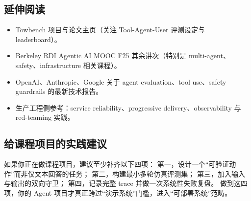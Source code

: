 \documentclass[a4paper]{article}
\begin{document}
\subsection{延伸阅读}

\begin{itemize}[leftmargin=1.5em]
    \item Towbench 项目与论文主页（关注 Tool-Agent-User 评测设定与 leaderboard）。
    \item Berkeley RDI Agentic AI MOOC F25 其余讲次（特别是 multi-agent、safety、infrastructure 相关课程）。
    \item OpenAI、Anthropic、Google 关于 agent evaluation、tool use、safety guardrails 的最新技术报告。
    \item 生产工程侧参考：service reliability、progressive delivery、observability 与 red-teaming 实践。
\end{itemize}

\subsection{给课程项目的实践建议}

如果你正在做课程项目，建议至少补齐以下四项：
第一，设计一个“可验证动作”而非仅文本回答的任务；
第二，构建最小多轮仿真评测集；
第三，加入输入与输出的双向守卫；
第四，记录完整 trace 并做一次系统性失败复盘。
做到这四项，你的 Agent 项目才真正跨过“演示系统”门槛，进入“可部署系统”范畴。
\end{document}
